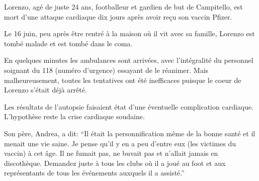 Lorenzo, agé de juste 24 ans, footballeur et gardien de but de Campitello, est
mort d'une attaque cardiaque dix jours après avoir reçu son vaccin Pfizer.

Le 16 juin, peu après être rentré à la maison où il vit avec sa famille, Lorenzo
est tombé malade et est tombé dans le coma.

En quelques minutes les ambulances sont arrivées, avec l'intégralité du
personnel soignant du 118 (numéro d'urgence) essayant de le réanimer. Mais
malheureusement, toutes les tentatives ont été inefficaces puisque le coeur de
Lorenzo s'était déjà arrêté.

Les résultats de l'autopsie faisaient état d'une éventuelle complication
cardiaque. L'hypothèse reste la crise cardiaque soudaine.

Son père, Andrea, a dit: “Il était la personnification même de la bonne santé et
il menait une vie saine. Je pense qu'il y en a peu d'entre eux (les victimes du
vaccin) à cet âge. Il ne fumait pas, ne buvait pas et n'allait jamais en
discothèque. Demandez juste à tous les clubs où il a joué au foot et aux
représentants de tous les événements auxquels il a assisté.”


